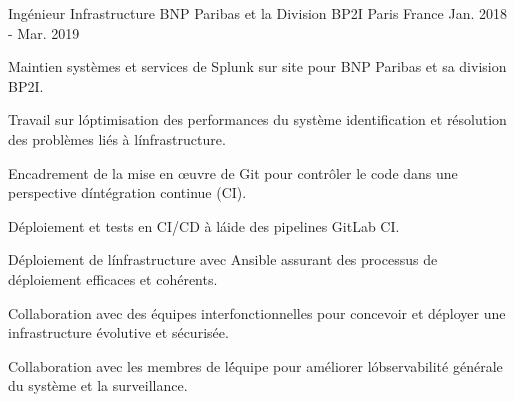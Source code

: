 \begin{cventries}
{    }


\cventry
{Ingénieur Infrastructure} %
{BNP Paribas et la Division BP2I} %
{Paris France} %
{Jan. 2018 - Mar. 2019} %
{
  \begin{cvitems} %
    \item {Maintien systèmes et services de Splunk sur site pour BNP Paribas et sa division BP2I.}
   \item {Travail sur l\' optimisation des performances du système identification et résolution des problèmes liés à l\' infrastructure.}
    \item {Encadrement de la mise en œuvre de Git pour contrôler le code dans une perspective d\' intégration continue (CI).}
    \item {Déploiement et tests en CI/CD à l\' aide des pipelines GitLab CI.}
    \item {Déploiement de l\' infrastructure avec Ansible assurant des processus de déploiement efficaces et cohérents.}
    \item {Collaboration avec des équipes interfonctionnelles pour concevoir et déployer une infrastructure évolutive et sécurisée.}
    \item {Collaboration avec les membres de l\' équipe pour améliorer l\' observabilité générale du système et la surveillance.}
  \end{cvitems}
}


\end{cventries}

